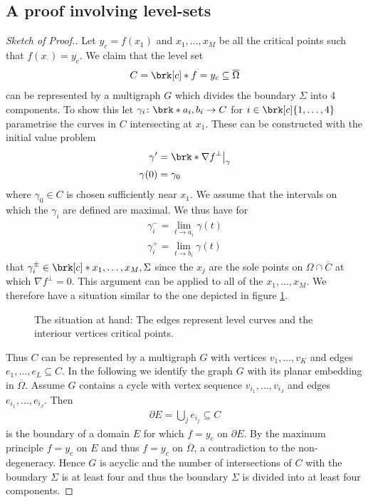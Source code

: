 \subsection{A proof involving level-sets}

\begin{proof}[Sketch of Proof.]
  Let $y_c=f(x_1)$ and $x_1,\dots,x_M$ be all the critical points such that $f(x_\cdot)=y_c$.
  We claim that the level set
  \begin{align*}
    C=\brk[c]*{f=y_c}\subseteq\overline{\Omega}
  \end{align*}
  can be represented by a multigraph $G$
  which divides the boundary $\Sigma$ into 4 components. To show this let $\gamma_i\colon \brk*{a_i,b_i}\to C$ for $i\in\brk[c]{1,\dots,4}$ parametrise the curves in
  $C$ intersecting at $x_1$. These can be constructed with the initial value problem
  \begin{align*} 
    \gamma'&=\brk*{\nabla f}^\perp\big\vert_\gamma \\
    \gamma(0) &= \gamma_0
  \end{align*}
  where $\gamma_0\in C$ is chosen sufficiently near $x_1$. We assume that the intervals on which the $\gamma_i$ are
  defined are maximal. We thus have for
  \begin{align*}
    \gamma_i^-=\lim_{t\to a_i}\gamma(t) \\
    \gamma_i^+=\lim_{t\to b_i}\gamma(t)
  \end{align*}
  that $\gamma_i^\pm\in\brk[c]*{x_1,\dots,x_M,\Sigma}$ since the $x_j$ are the sole points on $\Omega\cap\overline{C}$
  at which $\nabla f^\perp=0$. This argument can be applied to all of the 
  $x_1,\dots,x_M$. We therefore have a situation similar to the one depicted in figure \ref{fi:n2:levelSets:overview}.
  
  \begin{figure}
    \centering
    \def\svgwidth{0.8\textwidth}
    
    \caption{The situation at hand: The edges represent level curves and the interiour vertices critical points.}
    \label{fi:n2:levelSets:overview}
  \end{figure}

  Thus $C$ can be represented by a multigraph $G$ with vertices $v_1,\dots,v_K$ and edges $e_1,\dots,e_L\subseteq C$.
  In the following we identify the graph $G$ with its planar embedding in $\overline{\Omega}$.
  Assume $G$ contains a cycle with vertex sequence $v_{i_1},\dots,v_{i_J}$ and edges $e_{i_1},\dots,e_{i_J}$. Then
  \begin{align*}
    \partial E = \bigcup_j e_{i_j}\subseteq C
  \end{align*}
  is the boundary of a domain $E$ for which $f=y_c$ on $\partial E$. By the maximum principle $f=y_c$ on $E$ and thus
  $f=y_c$ on $\overline{\Omega}$, a contradiction to the non-degeneracy. Hence $G$ is acyclic and the number of 
  intersections of $C$ with the boundary $\Sigma$ is at least four and thus the boundary $\Sigma$ is divided into at least four components.
  

\end{proof}
